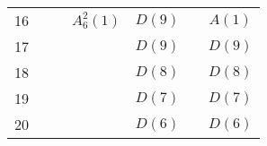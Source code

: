 \begin{center}
\begin{tabular}{rlllllc}
    16 &             &                  & $A_6^2(1)$         & $D(9)$             &              & $A(1)$ \\
    17 &             &                  &                    & $D(9)$             &              & $D(9)$ \\
    18 &             &                  &                    & $D(8)$             &              & $D(8)$ \\
    19 &             &                  &                    & $D(7)$             &              & $D(7)$ \\
    20 &             &                  &                    & $D(6)$             &              & $D(6)$ \\
    \bottomrule
  \end{tabular}
\end{center}
